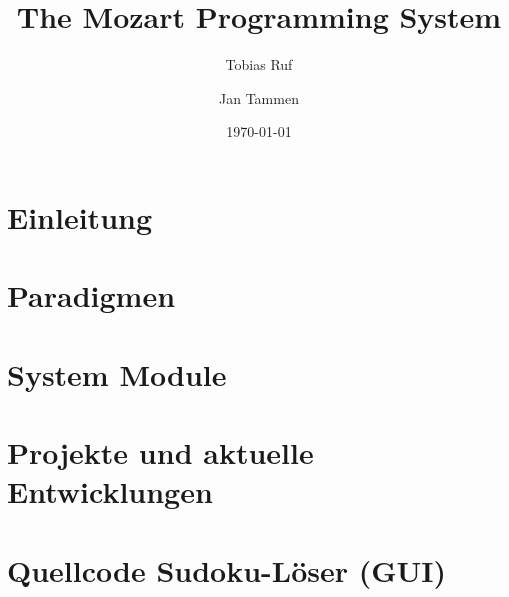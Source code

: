 \documentclass[
	a4paper,     		%
	headsepline, 		%
	footsepline, 		%
	titlepage,   		%
	12pt,        		%
]{scrreprt}
\title{The Mozart Programming System}
\author{%
	Tobias Ruf
	\and{%
		Jan Tammen
	}%
}%
\date{\today}
\begin{document}
\maketitle

\tableofcontents



\chapter{Einleitung}


\chapter{Paradigmen} \label{chapter:paradigmen}


\chapter{System Module}


\chapter{Projekte und aktuelle Entwicklungen}




\appendix
\pdfbookmark[-1]{\appendixname}{\appendixname} 

\chapter{Quellcode Sudoku-Löser (GUI)}




\renewcommand{\bibname}{Quellen}



\end{document}
